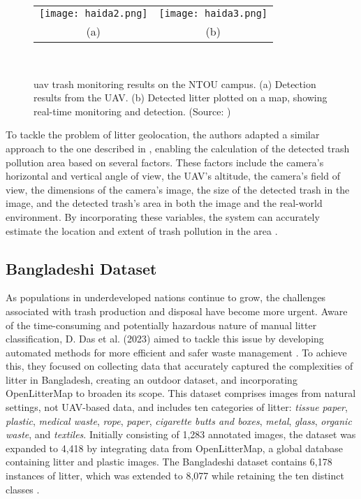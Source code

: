 \begin{figure}[!htbp]
  \centering
  \begin{tabular}{cc}
    \texttt{[image: haida2.png]} &
    \texttt{[image: haida3.png]} \\
    \small (a) & \small (b) \\
  \end{tabular}\\
  \caption{\gls{uav} trash monitoring results on the NTOU campus. (a) Detection results from the UAV. (b) Detected litter plotted on a map, showing real-time monitoring and detection. (Source: \cite{haida})}
  \label{fig:haida2}
\end{figure}

To tackle the problem of litter geolocation, the authors adapted a similar approach to the one described in \cite{uavvaste}, enabling the calculation of the detected trash pollution area based on several factors. These factors include the camera’s horizontal and vertical angle of view, the UAV’s altitude, the camera's field of view, the dimensions of the camera's image, the size of the detected trash in the image, and the detected trash's area in both the image and the real-world environment. By incorporating these variables, the system can accurately estimate the location and extent of trash pollution in the area \cite{haida}.

\subsection{Bangladeshi Dataset}
\label{subsec:3_bangladeshi}

As populations in underdeveloped nations continue to grow, the challenges associated with trash production and disposal have become more urgent. Aware of the time-consuming and potentially hazardous nature of manual litter classification, D. Das et al. (2023) aimed to tackle this issue by developing automated methods for more efficient and safer waste management \cite{bangladeshi}. To achieve this, they focused on collecting data that accurately captured the complexities of litter in Bangladesh, creating an outdoor dataset, and incorporating OpenLitterMap to broaden its scope. This dataset comprises images from natural settings, not UAV-based data, and includes ten categories of litter: \textit{tissue paper}, \textit{plastic}, \textit{medical waste}, \textit{rope}, \textit{paper}, \textit{cigarette butts and boxes}, \textit{metal}, \textit{glass}, \textit{organic waste}, and \textit{textiles}. Initially consisting of 1,283 annotated images, the dataset was expanded to 4,418 by integrating data from OpenLitterMap, a global database containing litter and plastic images. The Bangladeshi dataset contains 6,178 instances of litter, which was extended to 8,077 while retaining the ten distinct classes \cite{bangladeshi}.

